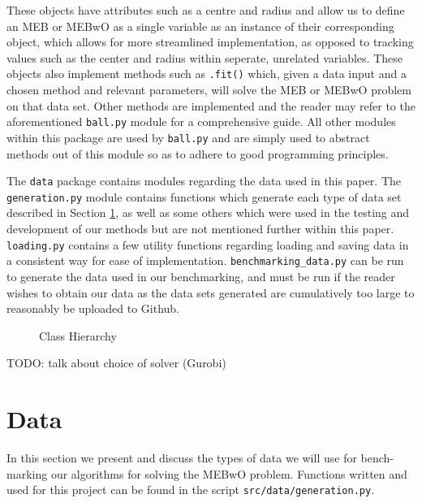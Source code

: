 \documentclass[11pt,twoside]{report}
\theoremstyle{definition}
\numberwithin{theorem}{section}
\numberwithin{definition}{section}
\numberwithin{lemma}{section}
\numberwithin{proposition}{section}
\numberwithin{equation}{section}
\numberwithin{figure}{section}
\begin{document}
These objects have attributes such as a centre and radius and allow us to define an MEB or MEBwO as a single variable as an instance of their corresponding object, which allows for more streamlined implementation, as opposed to tracking values such as the center and radius within seperate, unrelated variables. These objects also implement methods such as \texttt{.fit()} which, given a data input and a chosen method and relevant parameters, will solve the MEB or MEBwO problem on that data set. Other methods are implemented and the reader may refer to the aforementioned \texttt{ball.py} module for a comprehensive guide. All other modules within this package are used by \texttt{ball.py} and are simply used to abstract methods out of this module so as to adhere to good programming principles.

The \texttt{data} package contains modules regarding the data used in this paper. The \texttt{generation.py} module contains functions which generate each type of data set described in Section \ref{data}, as well as some others which were used in the testing and development of our methods but are not mentioned further within this paper. \texttt{loading.py} contains a few utility functions regarding loading and saving data in a consistent way for ease of implementation. \texttt{benchmarking\_data.py} can be run to generate the data used in our benchmarking, and must be run if the reader wishes to obtain our data as the data sets generated are cumulatively too large to reasonably be uploaded to Github. 

\begin{figure}
    \centering
    \caption{Class Hierarchy}
    \label{fig:hierarchy}
\end{figure}

TODO: talk about choice of solver (Gurobi)

\section{Data}\label{data}
In this section we present and discuss the types of data we will use for bench-marking our algorithms for solving the MEBwO problem. Functions written and used for this project can be found in the script \texttt{src/data/generation.py}.
\end{document}
